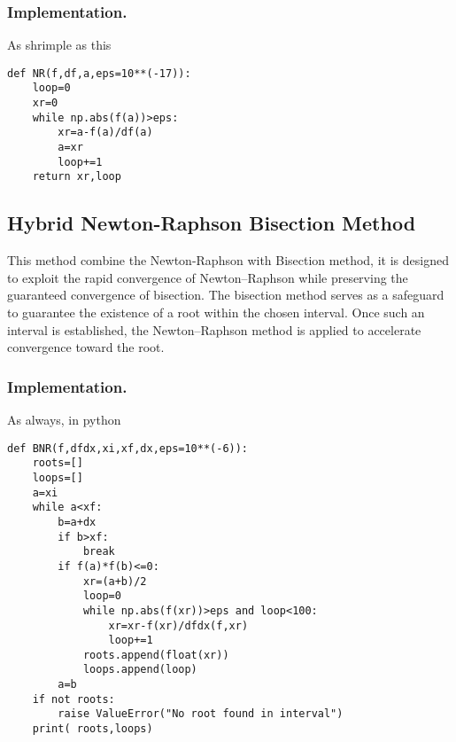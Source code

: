 \documentclass[../../../main.tex]{subfiles}
\begin{document}
\subsubsection{Implementation.}
As shrimple as this
\begin{verbatim}
def NR(f,df,a,eps=10**(-17)):
    loop=0 
    xr=0
    while np.abs(f(a))>eps:
        xr=a-f(a)/df(a)
        a=xr 
        loop+=1
    return xr,loop
\end{verbatim}

\subsection{Hybrid Newton-Raphson Bisection Method}
This method combine the Newton-Raphson with Bisection method, it is designed to exploit the rapid convergence of Newton–Raphson while preserving the guaranteed convergence of bisection.
The bisection method serves as a safeguard to guarantee the existence of a root within the chosen interval. 
Once such an interval is established, the Newton–Raphson method is applied to accelerate convergence toward the root. 

\subsubsection*{Implementation.} As always, in python
\begin{verbatim}
def BNR(f,dfdx,xi,xf,dx,eps=10**(-6)):
    roots=[]
    loops=[]
    a=xi
    while a<xf:
        b=a+dx 
        if b>xf:
            break
        if f(a)*f(b)<=0:
            xr=(a+b)/2
            loop=0 
            while np.abs(f(xr))>eps and loop<100:
                xr=xr-f(xr)/dfdx(f,xr)
                loop+=1
            roots.append(float(xr))
            loops.append(loop)
        a=b
    if not roots:
        raise ValueError("No root found in interval")
    print( roots,loops)
\end{verbatim}
\end{document}
